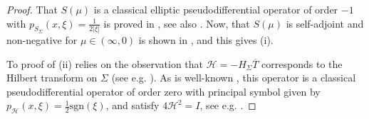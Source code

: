 \documentclass[11pt,a4paper,reqno,oneside]{amsproc}
\numberwithin{equation}{section}
\begin{document}
\begin{proof}  That $S(\mu)$ is a  classical elliptic pseudodifferential operator of order $-1$ with  $p_{S_\Sigma}(x,\xi)= \frac{1}{2|\xi|}$  is  proved  in \cite[§ 11.4.1]{HW}, see also \cite[Proposition 11.2]{T1}. Now,  that $S(\mu)$  is self-adjoint and non-negative for $\mu\in(\infty,0)$ is shown in \cite[Sec. 2]{BCP}, and this gives (i).

To proof of (ii) relies on the observation that $\mathcal H=-H_\Sigma \overline{T}$ corresponds to the Hilbert transform on $\Sigma$ (see e.g. \cite[Sec.~5]{bell}). As is well-known \cite[§ 11.3.1, p. 693]{HW},  this operator is a classical pseudodifferential operator of order zero with principal symbol given by $p_{\mathcal H}(x,\xi)= \frac{1}{2}\mathrm{sgn}(\xi)$, and satisfy $4 \mathcal H^2 =I$, see e.g. \cite[§  27]{musk}. 
\end{proof}
\end{document}
